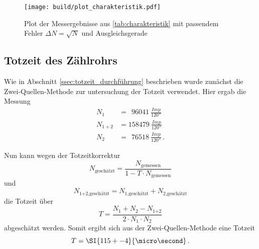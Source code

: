 \begin{figure}
    \centering
    \texttt{[image: build/plot\_charakteristik.pdf]}
    \caption{Plot der Messergebnisse aus \autoref{tab:charakteristik} mit passendem Fehler $\Delta N = \sqrt{N}$ und Ausgleichsgerade}
    \label{fig:plot_charakteristik}
\end{figure}


\subsection{Totzeit des Zählrohrs}
\label{ssec:totzeit_auswertung}

Wie in Abschnitt \ref{ssec:totzeit_durchführung} beschrieben wurde zunächst die Zwei-Quellen-Methode zur untersuchung der Totzeit verwendet.
Hier ergab die Messung
\begin{align*}
    N_1 &= \:\:\SI{96041}{\frac{Imp}{120\second}} \\
    N_{1+2} &= \SI{158479}{\frac{Imp}{120\second}} \\
    N_2 &= \:\:\SI{76518}{\frac{Imp}{120\second}} \, .
\end{align*}

Nun kann wegen der Totzeitkorrektur
\begin{equation}
    N_\text{geschätzt} = \frac{N_\text{gemessen}}{1-T \cdot N_\text{gemessen}}
\end{equation}
und
\begin{equation}
    N_\text{1+2,geschätzt} = N_\text{1,geschätzt} + N_\text{2,geschätzt}
\end{equation}
die Totzeit über
\begin{equation}
    T = \frac{N_1 + N_2 - N_\text{1+2}}{2 \cdot N_1 \cdot N_2}
\end{equation}
abgeschätzt werden.
Somit ergibt sich aus der Zwei-Quellen-Methode eine Totzeit 
\begin{equation*}
    T = \SI{115+-4}{\micro\second} \, .
\end{equation*}

